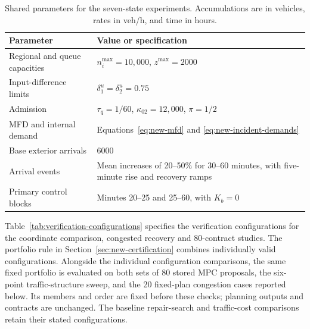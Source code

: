 \begin{table}[!htbp]
\centering\small
\caption{Shared parameters for the seven-state experiments. Accumulations
are in vehicles, rates in veh/h, and time in hours.}
\label{tab:experiment-parameters}
\begin{tabularx}{\linewidth}{@{}lX@{}}
\toprule
Parameter & Value or specification\\
\midrule
Regional and queue capacities & $n_i^{\max}=10{,}000$, $z^{\max}=2000$\\
Input-difference limits & $\delta_1^u=\delta_2^u=0.75$\\
Admission & $\tau_q=1/60$, $\kappa_{02}=12{,}000$, $\pi=1/2$\\
MFD and internal demand & Equations~\eqref{eq:new-mfd} and \eqref{eq:new-incident-demands}\\
Base exterior arrivals & $6000$\\
Arrival events & Mean increases of 20--50\% for 30--60 minutes, with
five-minute rise and recovery ramps\\
Primary control blocks & Minutes 20--25 and 25--60, with $K_b=0$\\
\bottomrule
\end{tabularx}
\end{table}

Table~\ref{tab:verification-configurations} specifies the verification
configurations for the coordinate comparison, congested recovery and
80-contract studies. The portfolio rule in Section~\ref{sec:new-certification}
combines individually valid configurations. Alongside the individual
configuration comparisons, the same fixed portfolio is evaluated on both
sets of 80 stored MPC proposals, the six-point traffic-structure sweep,
and the 20 fixed-plan congestion cases reported below. Its members and
order are fixed before these checks; planning outputs and contracts are
unchanged. The baseline repair-search and traffic-cost comparisons retain
their stated configurations.

